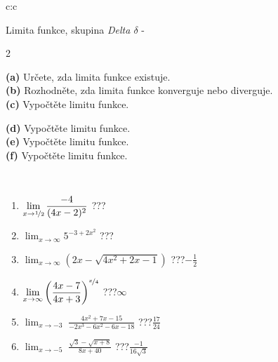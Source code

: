 \documentclass[10pt]{report}
\begin{document}
\newpage
\thispagestyle{empty}
\begin{tabular}{c:c}
\begin{minipage}[c][104.5mm][t]{0.5\linewidth}
\begin{center}
\vspace{7mm}
{\huge Limita funkce, skupina \textit{Delta $\delta$} -}\\[5mm]
\begin{minipage}{0.95\linewidth}
\begin{center}
{\small \begin{multicols}{2} \raggedright
\textbf{(a)} Určete, zda limita funkce existuje. \\[1mm]
\textbf{(b)} Rozhodněte, zda limita funkce konverguje nebo diverguje. \\[1mm]
\textbf{(c)} Vypočtěte limitu funkce. \par \columnbreak
\textbf{(d)} Vypočtěte limitu funkce. \\[1mm]
\textbf{(e)} Vypočtěte limitu funkce. \\[1mm]
\textbf{(f)} Vypočtěte limitu funkce. \\[1mm]
\end{multicols}
}
\end{center}
\end{minipage}
\\[4mm]
\begin{minipage}{0.79\linewidth}
\begin{center}
\begin{varwidth}{\linewidth}
\begin{enumerate}
\normalsize
\item $\displaystyle\lim_{x\to\nicefrac{1}{2}}{\frac{-4}{(4x-2)^{2}}}$\quad \dotfill\; ???\;\dotfill \quad {}
\item $\displaystyle\lim_{x\to\infty}{5^{-3+2x^2}}$\quad \dotfill\; ???\;\dotfill \quad {}
\item $\displaystyle\lim_{x\to\infty}{\left(2x - \sqrt{4x^2+2x-1}\right)}$\quad \dotfill\; ???\;\dotfill \quad $-\frac{1}{2}$
\item $\displaystyle\lim_{x\to\infty}{\left( \frac{4x-7}{4x+3} \right)^{\nicefrac{x}{4}}}$\quad \dotfill\; ???\;\dotfill \quad $\infty$
\item $\displaystyle\lim_{x\to -3}{\;\frac{4x^2+7x-15}{-2x^3-6x^2-6x-18}}$\quad \dotfill\; ???\;\dotfill \quad $\frac{17}{24}$
\item $\displaystyle\lim_{x\to -5}{\;\frac{\sqrt{3}-\sqrt{x+8}}{8x+40}}$\quad \dotfill\; ???\;\dotfill \quad $\frac{-1}{16\sqrt{3}}$

\end{enumerate}
\end{varwidth}
\end{center}
\end{minipage}
\end{center}
\end{minipage}
\end{tabular}
\end{document}
